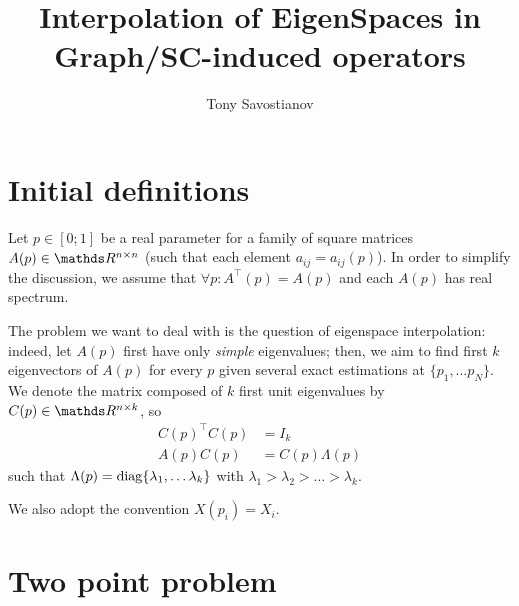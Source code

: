 \documentclass{mynotes}
\title{Interpolation of EigenSpaces in Graph/SC-induced operators}
\author[1]{ Tony Savostianov }
\affil[1]{ RWTH Aachen   \\ email: \email{anton.savostianov@gssi.it} }
\begin{document}
\maketitle


\section{Initial definitions}

\begin{definition}
      Let \( p \in [0; 1] \) be a real parameter for a family of square matrices \( A(p) \in \ds R^{n \times n} \) (such that each element \( a_{ij} = a_{ij}(p) \)). In order to simplify the discussion, we assume that \( \forall p: A^\top (p) = A (p) \) and each \( A(p )\) has real spectrum.
\end{definition}

The problem we want to deal with is the question of eigenspace interpolation: indeed, let \( A(p) \) first have only \emph{simple} eigenvalues; then, we aim to find first \( k \) eigenvectors of \( A(p) \) for every \( p \) given several exact estimations at \( \{ p_1, \dots p_N \}\). We denote the matrix composed of \( k\) first unit eigenvalues by \( C(p) \in \ds R^{n \times k} \), so 
\begin{equation}
      \begin{aligned}
            C(p)^\top C(p) & = I_k \\
            A(p) C(p) & =  C(p) \Lambda(p)
      \end{aligned}
      \label{eq:eig}
\end{equation}
such that \( \Lambda(p) = \operatorname{diag} \{ \lambda_1, \dots \lambda_k \} \) with \( \lambda_1 > \lambda_2 > \dots > \lambda_k \).

We also adopt the convention \( X ( p_i ) = X_i \).



\section{Two point problem}
\end{document}
